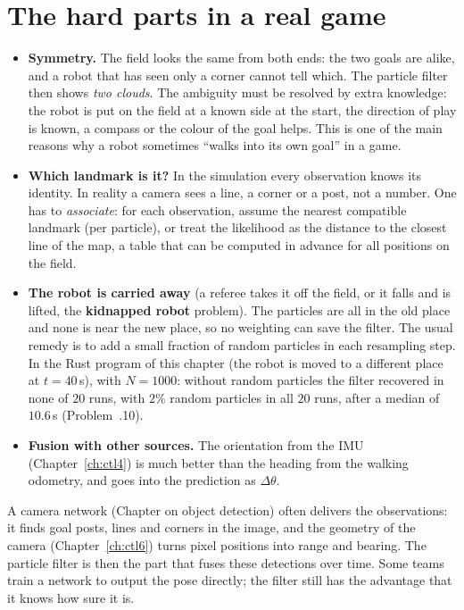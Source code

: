 \section*{The hard parts in a real game}
\begin{itemize}[nosep]
  \item \textbf{Symmetry.} The field looks the same from both ends: the two goals are alike, and a robot that has seen only a corner cannot tell which. The particle filter then shows \emph{two clouds}. The ambiguity must be resolved by extra knowledge: the robot is put on the field at a known side at the start, the direction of play is known, a compass or the colour of the goal helps. This is one of the main reasons why a robot sometimes ``walks into its own goal'' in a game.
  \item \textbf{Which landmark is it?} In the simulation every observation knows its identity. In reality a camera sees a line, a corner or a post, not a number. One has to \emph{associate}: for each observation, assume the nearest compatible landmark (per particle), or treat the likelihood as the distance to the closest line of the map, a table that can be computed in advance for all positions on the field.
  \item \textbf{The robot is carried away} (a referee takes it off the field, or it falls and is lifted, the \textbf{kidnapped robot} problem). The particles are all in the old place and none is near the new place, so no weighting can save the filter. The usual remedy is to add a small fraction of random particles in each resampling step. In the Rust program of this chapter (the robot is moved to a different place at $t=40$\,s), with $N=1000$: without random particles the filter recovered in none of $20$ runs, with $2\%$ random particles in all $20$ runs, after a median of $10.6$\,s (Problem~\thechapter.10).
  \item \textbf{Fusion with other sources.} The orientation from the IMU (Chapter~\ref{ch:ctl4}) is much better than the heading from the walking odometry, and goes into the prediction as $\Delta\theta$.
\end{itemize}

\begin{aibox}
A camera network (Chapter on object detection) often delivers the observations: it finds goal posts, lines and corners in the image, and the geometry of the camera (Chapter~\ref{ch:ctl6}) turns pixel positions into range and bearing. The particle filter is then the part that fuses these detections over time. Some teams train a network to output the pose directly; the filter still has the advantage that it knows how sure it is.
\end{aibox}

